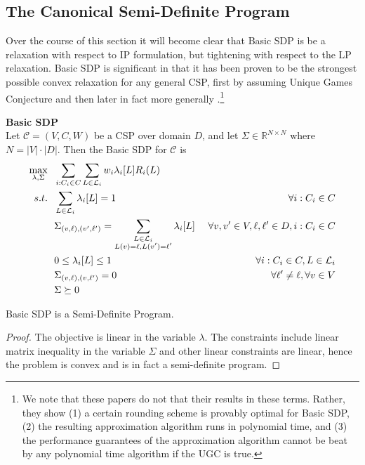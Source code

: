 \subsection{The Canonical Semi-Definite Program}

Over the course of this section it will become clear that Basic SDP is be a relaxation with respect to IP formulation, but tightening with respect to the LP relaxation. Basic SDP is significant in that it has been proven to be the strongest possible convex relaxation for any general CSP, first by assuming Unique Games Conjecture \cite{Rag08} and then later in fact more generally \cite{nphard}.\footnote{We note that these papers do not that their results in these terms. Rather, they show (1) a certain rounding scheme is provably optimal for Basic SDP, (2) the resulting approximation algorithm runs in polynomial time, and (3) the performance guarantees of the approximation algorithm cannot be beat by any polynomial time algorithm if the UGC is true.}

\begin{definition}\textbf{Basic SDP} \\
Let $\mathcal{C} = (V,C,W)$ be a CSP over domain $D$, and let $\Sigma \in \mathbb{R}^{N \times N}$ where $N = |V| \cdot |D|$. Then the Basic SDP for $\mathcal{C}$ is
\begin{alignat}{2}
\max_{\lambda, \Sigma} ~&~ \sum_{i : C_i \in C} \sum_{L \in \mathcal{L}_i}   w_i\lambda_i[L] R_i(L) & \\
s.t. ~ & ~ \sum_{L \in \mathcal{L}_i} \lambda_i[L] = 1  & \forall i : C_i \in C \label{eq:SDPlambdaSum} \\
     ~ & ~ \Sigma_{\left(v, \ell\right),\left(v', \ell'\right)} = \sum_{\substack {L\in \mathcal{L}_{i}\\ L(v) = \ell, L(v')=\ell'} }\lambda_{i}[L] &~\forall v,v' \in V, \ell,\ell' \in D, i : C_i \in C \label{eq:SDPtiePSD}\\
     ~ & ~ 0 \leq \lambda_i[L] \leq 1  & \forall  i : C_i \in C, L \in \mathcal{L}_i  \label{eq:SDPlambdaNonNeg} \\ 
     ~& ~ \Sigma_{\left(v, \ell\right),\left(v, \ell'\right)} = 0 & \forall \ell' \neq \ell,  \forall v \in V\\
     ~ & ~ \Sigma \succeq 0& \label{eq:SDPPSD}
\end{alignat}
\end{definition}

\begin{theorem}
Basic SDP is a Semi-Definite Program.
\end{theorem}
\begin{proof}
The objective is linear in the variable $\lambda$. The constraints include linear matrix inequality in the variable $\Sigma$ and other linear constraints are linear, hence the problem is convex and is in fact a semi-definite program.
\end{proof}


